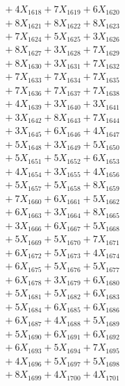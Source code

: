 \documentclass[a4paper,10pt]{article}
\begin{document}
{\begin{align}
&\;  + 4 X_{1618} + 7 X_{1619} + 6 X_{1620} \\[0.3ex]
&\;  + 8 X_{1621} + 8 X_{1622} + 8 X_{1623} \\[0.3ex]
&\;  + 7 X_{1624} + 5 X_{1625} + 3 X_{1626} \\[0.3ex]
&\;  + 8 X_{1627} + 3 X_{1628} + 7 X_{1629} \\[0.5ex]\allowbreak
&\;  + 8 X_{1630} + 3 X_{1631} + 7 X_{1632} \\[0.3ex]
&\;  + 7 X_{1633} + 7 X_{1634} + 7 X_{1635} \\[0.3ex]
&\;  + 7 X_{1636} + 7 X_{1637} + 7 X_{1638} \\[0.3ex]
&\;  + 4 X_{1639} + 3 X_{1640} + 3 X_{1641} \\[0.3ex]
&\;  + 3 X_{1642} + 8 X_{1643} + 7 X_{1644} \\[0.3ex]
&\;  + 3 X_{1645} + 6 X_{1646} + 4 X_{1647} \\[0.3ex]
&\;  + 5 X_{1648} + 3 X_{1649} + 5 X_{1650} \\[0.3ex]
&\;  + 5 X_{1651} + 5 X_{1652} + 6 X_{1653} \\[0.3ex]
&\;  + 4 X_{1654} + 3 X_{1655} + 4 X_{1656} \\[0.3ex]
&\;  + 5 X_{1657} + 5 X_{1658} + 8 X_{1659} \\[0.5ex]\allowbreak
&\;  + 7 X_{1660} + 6 X_{1661} + 5 X_{1662} \\[0.3ex]
&\;  + 6 X_{1663} + 3 X_{1664} + 8 X_{1665} \\[0.3ex]
&\;  + 3 X_{1666} + 6 X_{1667} + 5 X_{1668} \\[0.3ex]
&\;  + 5 X_{1669} + 5 X_{1670} + 7 X_{1671} \\[0.3ex]
&\;  + 6 X_{1672} + 5 X_{1673} + 4 X_{1674} \\[0.3ex]
&\;  + 6 X_{1675} + 5 X_{1676} + 5 X_{1677} \\[0.3ex]
&\;  + 6 X_{1678} + 3 X_{1679} + 6 X_{1680} \\[0.3ex]
&\;  + 5 X_{1681} + 5 X_{1682} + 6 X_{1683} \\[0.3ex]
&\;  + 5 X_{1684} + 6 X_{1685} + 6 X_{1686} \\[0.3ex]
&\;  + 6 X_{1687} + 4 X_{1688} + 5 X_{1689} \\[0.5ex]\allowbreak
&\;  + 5 X_{1690} + 6 X_{1691} + 6 X_{1692} \\[0.3ex]
&\;  + 6 X_{1693} + 5 X_{1694} + 7 X_{1695} \\[0.3ex]
&\;  + 4 X_{1696} + 5 X_{1697} + 5 X_{1698} \\[0.3ex]
&\;  + 8 X_{1699} + 4 X_{1700} + 4 X_{1701} \\[0.3ex]

\end{align}}
\end{document}
